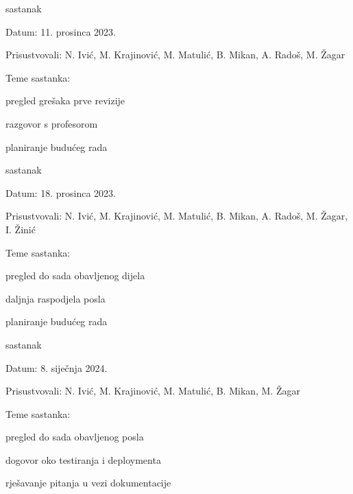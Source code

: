 \begin{packed_enum}
			\item  sastanak
			\item[] \begin{packed_item}
				\item Datum: 11. prosinca 2023.
				\item Prisustvovali: N. Ivić, M. Krajinović, M. Matulić, B. Mikan, A. Radoš, M. Žagar
				\item Teme sastanka:
				\begin{packed_item}
					\item  pregled grešaka prve revizije
					\item  razgovor s profesorom
					\item  planiranje budućeg rada
				\end{packed_item}
			\end{packed_item}

			\item  sastanak
			\item[] \begin{packed_item}
				\item Datum: 18. prosinca 2023.
				\item Prisustvovali: N. Ivić, M. Krajinović, M. Matulić, B. Mikan, A. Radoš, M. Žagar, I. Žinić
				\item Teme sastanka:
				\begin{packed_item}
					\item  pregled do sada obavljenog dijela
					\item  daljnja raspodjela posla
					\item  planiranje budućeg rada
				\end{packed_item}
			\end{packed_item}
			
			\item  sastanak
			\item[] \begin{packed_item}
				\item Datum: 8. siječnja 2024.
				\item Prisustvovali: N. Ivić, M. Krajinović, M. Matulić, B. Mikan, M. Žagar
				\item Teme sastanka:
				\begin{packed_item}
					\item  pregled do sada obavljenog posla
					\item  dogovor oko testiranja i deploymenta
					\item  rješavanje pitanja u vezi dokumentacije
				\end{packed_item}
			\end{packed_item}
			
			
		\end{packed_enum}
		
